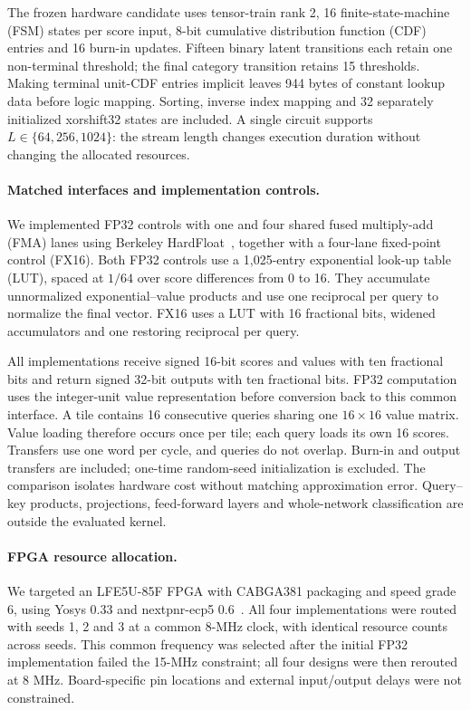 The frozen hardware candidate uses tensor-train rank 2, 16
finite-state-machine (FSM) states per score input, 8-bit cumulative
distribution function (CDF) entries and 16 burn-in updates.
Fifteen binary latent transitions each retain one non-terminal threshold;
the final category transition retains 15 thresholds. Making terminal
unit-CDF entries implicit leaves 944 bytes of constant lookup data before
logic mapping. Sorting, inverse index mapping and 32 separately
initialized xorshift32 states are included. A single circuit supports
$L\in\{64,256,1024\}$: the stream length changes execution duration
without changing the allocated resources.

\paragraph{Matched interfaces and implementation controls.}
We implemented FP32 controls with one and four shared fused
multiply-add (FMA) lanes using Berkeley
HardFloat~\cite{hauser2019hardfloat}, together with a four-lane
fixed-point control (FX16). Both FP32 controls use a 1,025-entry
exponential look-up table (LUT), spaced at $1/64$ over score differences
from 0 to 16. They accumulate unnormalized exponential--value products
and use one reciprocal per query to normalize the final vector.
FX16 uses a LUT with 16 fractional bits, widened accumulators and one
restoring reciprocal per query.

All implementations receive signed 16-bit scores and values with ten
fractional bits and return signed 32-bit outputs with ten fractional
bits. FP32 computation uses the integer-unit value representation before
conversion back to this common interface. A tile contains 16 consecutive
queries sharing one $16\times16$ value matrix. Value loading therefore
occurs once per tile; each query loads its own 16 scores. Transfers use
one word per cycle, and queries do not overlap. Burn-in and output
transfers are included; one-time random-seed initialization is excluded.
The comparison isolates hardware cost without matching approximation
error. Query--key products, projections, feed-forward layers and
whole-network classification are outside the evaluated kernel.

\paragraph{FPGA resource allocation.}
We targeted an LFE5U-85F FPGA with CABGA381 packaging and speed grade 6,
using Yosys 0.33 and nextpnr-ecp5
0.6~\cite{yosysSoftware,nextpnrSoftware}. All four implementations were
routed with seeds 1, 2 and 3 at a common 8-MHz clock, with identical
resource counts across seeds. This common frequency was selected after
the initial FP32 implementation failed the 15-MHz constraint; all four
designs were then rerouted at 8 MHz. Board-specific pin locations and
external input/output delays were not constrained.

